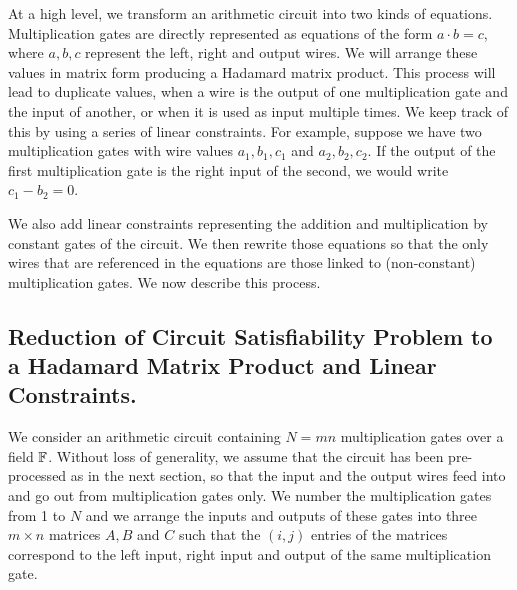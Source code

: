 At a high level, we transform an arithmetic circuit into two kinds of equations. 
Multiplication gates are directly represented as equations of the form $a\cdot b=c$, where $a,b,c$ represent the left, right and output wires. We will arrange these values in matrix form producing a Hadamard matrix product. This process will lead to duplicate values, when a wire is the output of one multiplication gate and the input of another, or when it is used as input multiple times. We keep track of this by using a series of linear constraints. For example, suppose we have two multiplication gates with wire values $a_1,b_1,c_1$ and $a_2,b_2,c_2$. If the output of the first multiplication gate is the right input of the second, we would write $c_1 - b_2 = 0$.

We also add linear constraints representing the addition and multiplication by constant gates of the circuit. We then rewrite those equations so that the only wires that are referenced in the equations are those linked to (non-constant) multiplication gates. %
We now describe this process.

\subsection{Reduction of Circuit Satisfiability Problem to a Hadamard Matrix Product and Linear Constraints.}
We consider an arithmetic circuit containing $N=mn$ multiplication gates over a field $\mathbb{F}$. Without loss of generality, we assume that the circuit has been pre-processed as in the next section, so that the input and the output wires feed into and go out from multiplication gates only.
We number the multiplication gates from 1 to $N$ and we arrange the inputs and outputs of these gates into three $m\times n$ matrices $A,B$ and $C$ such that the $(i,j)$ entries of the matrices correspond to the left input, right input and output of the same multiplication gate.

